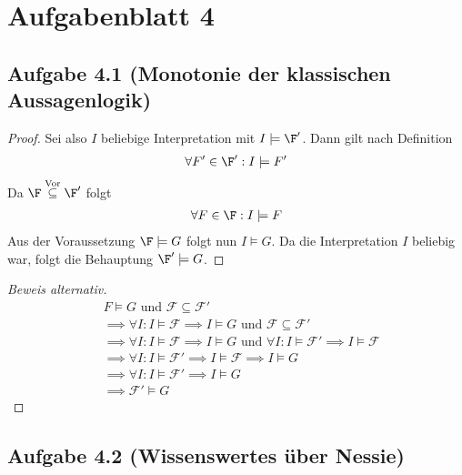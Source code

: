 
\section{Aufgabenblatt 4}
\subsection{Aufgabe 4.1 (Monotonie der klassischen Aussagenlogik)}

\begin{proof}
	Sei also $I$ beliebige Interpretation mit $I\models\F'$. 
	Dann gilt nach Definition
	\begin{align*}
		\forall F'\in\F':I\models F'
	\end{align*}
	Da $\F\stackrel{\text{Vor}}{\subseteq}\F'$ folgt 
	\begin{align*}
		\forall F\in\F:I\models F
	\end{align*}
	Aus der Voraussetzung $\F\models G$ folgt nun $I\models G$. 
	Da die Interpretation $I$ beliebig war, folgt die Behauptung $\F'\models G$. 
\end{proof}
\begin{proof}[Beweis alternativ]
	\begin{align*}
		& F \models G \text{ und } \mathcal{F} \subseteq \mathcal{F}'\\
		& \implies \forall I : I \models \mathcal{F} \implies I \models G \text{ und } \mathcal{F} \subseteq \mathcal{F}'\\
		& \implies \forall I : I \models \mathcal{F} \implies I \models G \text{ und } \forall I : I \models \mathcal{F}' \implies I \models \mathcal{F}\\
		& \implies \forall I : I \models \mathcal{F}' \implies I \models \mathcal{F} \implies I \models G\\
		& \implies \forall I : I \models \mathcal{F}' \implies I \models G\\
		& \implies \mathcal{F}' \models G
	\end{align*}
\end{proof}

\subsection{Aufgabe 4.2  (Wissenswertes über Nessie)}
